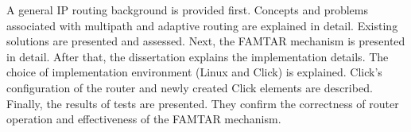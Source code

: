 \noindent A general IP routing background is provided first. Concepts and problems associated with multipath and adaptive routing are explained in detail. Existing solutions are presented and assessed. Next, the FAMTAR mechanism is presented in detail. After that, the dissertation explains the implementation details. The choice of implementation environment (Linux and Click) is explained. Click's configuration of the router and newly created Click elements are described. Finally, the results of tests are presented. They confirm the correctness of router operation and effectiveness of the FAMTAR mechanism.
